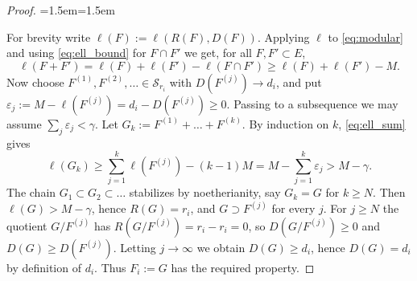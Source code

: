 \documentclass[12pt]{amsart}
\numberwithin{theorem}{section}
\theoremstyle{definition}
\newenvironment{illustration}{\par\medskip\begingroup\footnotesize\noindent\leftskip=1.5em\rightskip=1.5em}{\par\endgroup\medskip\noindent\ignorespaces}
\begin{document}
\begin{proof}
\begin{illustration}
\begin{center}
\begin{tikzpicture}[scale=1.15, >=stealth, rotate=90]
			\end{tikzpicture}
		\end{center}
		\end{illustration}
		For brevity write $\ell(F) := \ell(R(F), D(F))$.
		Applying $\ell$ to \eqref{eq:modular} and using \eqref{eq:ell_bound} for $F \cap F'$ we get, for all $F, F' \subset E$,
		\begin{equation}
			\label{eq:ell_sum}
			\ell(F + F') = \ell(F) + \ell(F') - \ell(F \cap F') \geqslant \ell(F) + \ell(F') - M .
		\end{equation}
		Now choose $F^{(1)}, F^{(2)}, \ldots \in \mathcal{S}_{r_i}$ with $D(F^{(j)}) \to d_i$, and put $\varepsilon_j := M - \ell(F^{(j)}) = d_i - D(F^{(j)}) \geqslant 0$.
		Passing to a subsequence we may assume $\sum_j \varepsilon_j < \gamma$.
		Let $G_k := F^{(1)} + \ldots + F^{(k)}$.
		By induction on $k$, \eqref{eq:ell_sum} gives
		\[
		\ell(G_k) \geqslant \sum_{j=1}^{k} \ell(F^{(j)}) - (k-1) M = M - \sum_{j=1}^{k} \varepsilon_j > M - \gamma .
		\]
		The chain $G_1 \subset G_2 \subset \ldots$ stabilizes by noetherianity, say $G_k = G$ for $k \geqslant N$.
		Then $\ell(G) > M - \gamma$, hence $R(G) = r_i$, and $G \supset F^{(j)}$ for every $j$.
		For $j \geqslant N$ the quotient $G / F^{(j)}$ has $R(G / F^{(j)}) = r_i - r_i = 0$, so $D(G / F^{(j)}) \geqslant 0$ and $D(G) \geqslant D(F^{(j)})$.
		Letting $j \to \infty$ we obtain $D(G) \geqslant d_i$, hence $D(G) = d_i$ by definition of $d_i$.
		Thus $F_i := G$ has the required property.
		

\end{proof}
\end{document}
